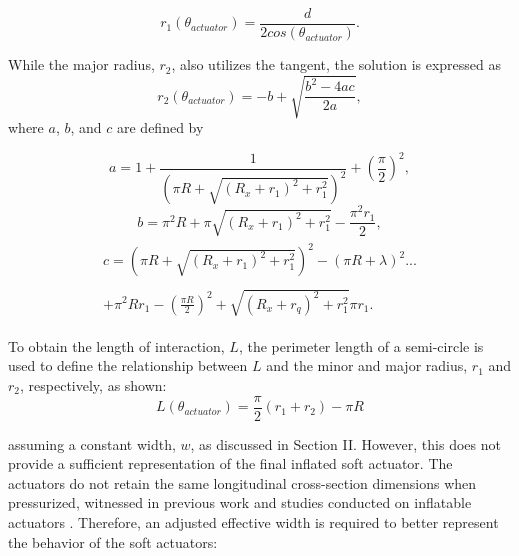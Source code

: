\documentclass[letterpaper, 10 pt, conference]{ieeeconf}  %
\begin{document}
\begin{equation}\label{r1}
	r_1(\theta_{actuator})  = \frac{d}{2cos(\theta_{actuator})}.
\end{equation}

While the major radius, $r_2$, also utilizes the tangent, the solution is expressed as
 \begin{equation}\label{r2}
	r_2(\theta_{actuator})  = -b + \sqrt{\frac{b^2-4ac}{2a}} ,
\end{equation}
where $a$, $b$, and $c$ are defined by

\begin{equation}\label{a}
	a = 1+\frac{1}{(\pi R+\sqrt{(R_x+r_1)^2+r_1^2})^2}+(\frac{\pi}{2})^2 ,
\end{equation}
\begin{equation}\label{a}
	b = \pi^2R+\pi\sqrt{(R_x+r_1)^2+r_1^2}-\frac{\pi^2r_1}{2} ,
\end{equation}
\begin{equation}\label{a}
\begin{aligned}
\begin{multlined}
	c = (\pi R+\sqrt{(R_x+r_1)^2+r_1^2})^2- (\pi R+\lambda)^2...\\\\
   +\pi^2Rr_1-(\frac{\pi R}{2})^2+\sqrt{(R_x+r_q)^2+r_1^2}\pi r_1 .
    \end{multlined}
    \end{aligned}
\end{equation}

To obtain the length of interaction, $L$, the perimeter length of a semi-circle is used to define the relationship between $L$ and the minor and major radius, $r_1$ and $r_2$, respectively, as shown: 
\begin{equation}\label{L}
	L(\theta_{actuator})  = \frac{\pi}{2}(r_1+r_2) -\pi R
\end{equation}


assuming a constant width, $w$, as discussed in Section II. However, this does not provide a sufficient representation of the final inflated soft actuator. The actuators do not retain the same longitudinal cross-section dimensions when pressurized, witnessed in previous work and studies conducted on inflatable actuators \cite{natividad2017h}. Therefore, an adjusted effective width is required to better represent the behavior of the soft actuators:
\end{document}
